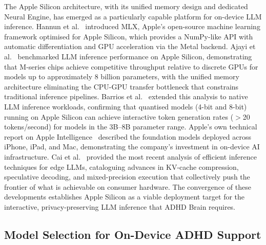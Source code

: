 The Apple Silicon architecture, with its unified memory design and dedicated Neural Engine, has emerged as a particularly capable platform for on-device LLM inference. Hannun et al.~\cite{hannun2023} introduced MLX, Apple's open-source machine learning framework optimised for Apple Silicon, which provides a NumPy-like API with automatic differentiation and GPU acceleration via the Metal backend. Ajayi et al.~\cite{ajayi2025} benchmarked LLM inference performance on Apple Silicon, demonstrating that M-series chips achieve competitive throughput relative to discrete GPUs for models up to approximately 8 billion parameters, with the unified memory architecture eliminating the CPU-GPU transfer bottleneck that constrains traditional inference pipelines. Barrios et al.~\cite{barrios2025} extended this analysis to native LLM inference workloads, confirming that quantised models (4-bit and 8-bit) running on Apple Silicon can achieve interactive token generation rates ($>$20 tokens/second) for models in the 3B--8B parameter range. Apple's own technical report on Apple Intelligence~\cite{apple2024} described the foundation models deployed across iPhone, iPad, and Mac, demonstrating the company's investment in on-device AI infrastructure. Cai et al.~\cite{cai2026} provided the most recent analysis of efficient inference techniques for edge LLMs, cataloguing advances in KV-cache compression, speculative decoding, and mixed-precision execution that collectively push the frontier of what is achievable on consumer hardware. The convergence of these developments establishes Apple Silicon as a viable deployment target for the interactive, privacy-preserving LLM inference that ADHD Brain requires.

\subsection{Model Selection for On-Device ADHD Support}
\label{sec:litrev_model_selection}

